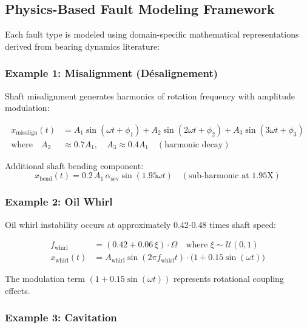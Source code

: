 \documentclass[11pt,a4paper]{article}
\begin{document}
\subsection{Physics-Based Fault Modeling Framework}

Each fault type is modeled using domain-specific mathematical representations derived from bearing dynamics literature:

\subsubsection{Example 1: Misalignment (Désalignement)}

Shaft misalignment generates harmonics of rotation frequency with amplitude modulation:

\begin{align}
x_{\text{misalign}}(t) &= A_1 \sin(\omega t + \phi_1) + A_2 \sin(2\omega t + \phi_2) + A_3 \sin(3\omega t + \phi_3) \label{eq:misalign} \\
\text{where} \quad A_2 &\approx 0.7 A_1, \quad A_3 \approx 0.4 A_1 \quad (\text{harmonic decay}) \nonumber
\end{align}

Additional shaft bending component:
\begin{equation}
x_{\text{bend}}(t) = 0.2 \, A_1 \, \alpha_{\text{sev}} \sin(1.95\omega t) \quad (\text{sub-harmonic at 1.95X})
\end{equation}

\subsubsection{Example 2: Oil Whirl}

Oil whirl instability occurs at approximately 0.42-0.48 times shaft speed:

\begin{align}
f_{\text{whirl}} &= (0.42 + 0.06 \, \xi) \cdot \Omega \quad \text{where } \xi \sim \mathcal{U}(0,1) \\
x_{\text{whirl}}(t) &= A_{\text{whirl}} \sin(2\pi f_{\text{whirl}} t) \cdot \big(1 + 0.15\sin(\omega t)\big) \label{eq:oilwhirl}
\end{align}

The modulation term $(1 + 0.15\sin(\omega t))$ represents rotational coupling effects.

\subsubsection{Example 3: Cavitation}
\end{document}
